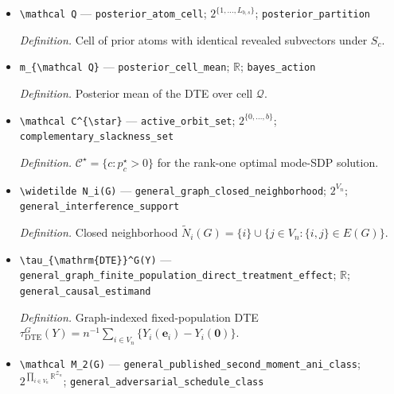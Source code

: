 \documentclass{article}
\begin{document}
\begin{itemize}
  \item \texttt{\textbackslash{}\allowbreak{}mathcal Q} --- \texttt{posterior\_\allowbreak{}atom\_\allowbreak{}cell}; \(2^{\{1,\ldots,L_{b,s}\}}\); \texttt{posterior\_\allowbreak{}partition}
  \par\smallskip\noindent\emph{Definition.} Cell of prior atoms with identical revealed subvectors under \(S_c\).
  \item \texttt{m\_\allowbreak{}\{\textbackslash{}\allowbreak{}mathcal Q\}\allowbreak{}} --- \texttt{posterior\_\allowbreak{}cell\_\allowbreak{}mean}; \(\mathbb R\); \texttt{bayes\_\allowbreak{}action}
  \par\smallskip\noindent\emph{Definition.} Posterior mean of the DTE over cell \(\mathcal Q\).
  \item \texttt{\textbackslash{}\allowbreak{}mathcal C\textasciicircum{}\{\textbackslash{}\allowbreak{}star\}\allowbreak{}} --- \texttt{active\_\allowbreak{}orbit\_\allowbreak{}set}; \(2^{\{0,\ldots,b\}}\); \texttt{complementary\_\allowbreak{}slackness\_\allowbreak{}set}
  \par\smallskip\noindent\emph{Definition.} \(\mathcal C^{\star}=\{c:p_c^{\star}>0\}\) for the rank-one optimal mode-SDP solution.
  \item \texttt{\textbackslash{}\allowbreak{}widetilde N\_\allowbreak{}i(G)} --- \texttt{general\_\allowbreak{}graph\_\allowbreak{}closed\_\allowbreak{}neighborhood}; \(2^{V_n}\); \texttt{general\_\allowbreak{}interference\_\allowbreak{}support}
  \par\smallskip\noindent\emph{Definition.} Closed neighborhood \(\widetilde N_i(G)=\{i\}\cup\{j\in V_n:\{i,j\}\in E(G)\}\).
  \item \texttt{\textbackslash{}\allowbreak{}tau\_\allowbreak{}\{\textbackslash{}\allowbreak{}mathrm\{DTE\}\allowbreak{}\}\allowbreak{}\textasciicircum{}G(Y)} --- \texttt{general\_\allowbreak{}graph\_\allowbreak{}finite\_\allowbreak{}population\_\allowbreak{}direct\_\allowbreak{}treatment\_\allowbreak{}effect}; \(\mathbb R\); \texttt{general\_\allowbreak{}causal\_\allowbreak{}estimand}
  \par\smallskip\noindent\emph{Definition.} Graph-indexed fixed-population DTE \(\tau_{\mathrm{DTE}}^G(Y)=n^{-1}\sum_{i\in V_n}\{Y_i(\mathbf e_i)-Y_i(\mathbf 0)\}\).
  \item \texttt{\textbackslash{}\allowbreak{}mathcal M\_\allowbreak{}2(G)} --- \texttt{general\_\allowbreak{}published\_\allowbreak{}second\_\allowbreak{}moment\_\allowbreak{}ani\_\allowbreak{}class}; \(2^{\prod_{i\in V_n}\mathbb R^{\mathcal Z_n}}\); \texttt{general\_\allowbreak{}adversarial\_\allowbreak{}schedule\_\allowbreak{}class}

\end{itemize}
\end{document}

